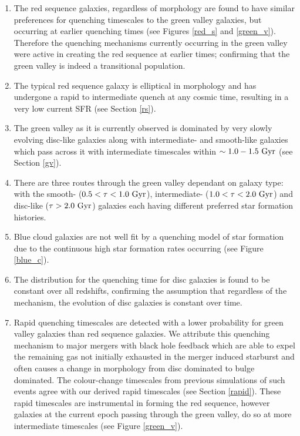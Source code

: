 \documentclass[useAMS,usenatbib]{mn2e}
\def\changed    {\color{titlecol} }
\begin{document}
\begin{enumerate}
\item The red sequence galaxies, regardless of morphology are found to have similar preferences for quenching timescales to the green valley galaxies, but occurring at earlier quenching times (see Figures \ref{red_s} and \ref{green_v}). Therefore the quenching mechanisms currently occurring in the green valley were active in creating the red sequence at earlier times; confirming that the green valley is indeed a transitional population.

\item {\changed The typical red sequence galaxy is elliptical in morphology and has undergone a rapid to intermediate quench at any cosmic time, resulting in a very low current SFR (see Section \ref{rs}).}

\item {\changed The green valley as it is currently observed is dominated by very slowly evolving disc-like galaxies along with intermediate- and smooth-like galaxies which pass across it with intermediate timescales within $\sim 1.0-1.5~\rm{Gyr}$ (see Section \ref{gv}).}

\item There are three routes through the green valley dependant on galaxy type: with the smooth- ($0.5 < \tau < 1.0 ~\rm{Gyr}$), intermediate- ($1.0 < \tau < 2.0~\rm{Gyr}$) and disc-like ($\tau > 2.0~\rm{Gyr}$) galaxies each having different preferred star formation histories. 

\item {\changed Blue cloud galaxies are not well fit by a quenching model of star formation due to the continuous high star formation rates occurring (see Figure \ref{blue_c}).}

\item {\changed The distribution for the quenching time for disc galaxies is found to be constant over all redshifts, confirming the assumption that regardless of the mechanism, the evolution of disc galaxies is constant over time.}

\item {\changed Rapid quenching timescales are detected with a lower probability for green valley galaxies than red sequence galaxies.} We attribute this quenching mechanism to major mergers with black hole feedback which are able to expel the remaining gas not initially exhausted in the merger induced starburst and often causes a change in morphology from disc dominated to bulge dominated. The colour-change timescales from previous simulations of such events agree with our derived rapid timescales  {\changed (see Section \ref{rapid}). These rapid timescales are instrumental in forming the red sequence, however galaxies at the current epoch passing through the green valley, do so at more intermediate timescales (see Figure \ref{green_v}).}


\end{enumerate}
\end{document}
